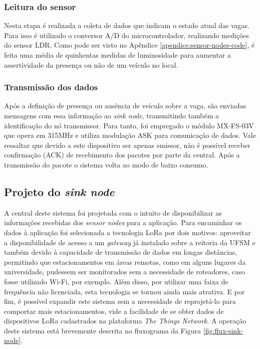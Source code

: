 \documentclass[oneside,openright,12pt]{ufsm_2015} %
\begin{document}
    \subsubsection{Leitura do sensor}
    Nesta etapa é realizada a coleta de dados que indicam o estado atual das vagas. Para isso é utilizado o conversor A/D do microcontrolador, realizando medições do sensor LDR. Como pode ser visto no Apêndice \ref{apendice:sensor-nodes-code}, é feita uma média de quinhentas medidas de luminosidade para aumentar a assertividade da presença ou não de um veículo no local.
    
    \subsubsection{Transmissão dos dados}
    Após a definição de presença ou ausência de veículo sobre a vaga, são enviadas mensagens com essa informação ao \textit{sink node}, transmitindo também a identificação do nó transmissor. Para tanto, foi empregado o módulo MX-FS-03V que opera em 315MHz e utiliza modulação ASK para comunicação de dados. Vale ressaltar que devido a este dispositivo ser apenas emissor, não é possível receber confirmação (ACK) de recebimento dos pacotes por parte da central. Após a transmissão do pacote o sistema volta ao modo de baixo consumo.
    
    \subsection{Projeto do \textit{sink node}}
    A central deste sistema foi projetada com o intuito de disponibilizar as informações recebidas dos \textit{sensor nodes} para a aplicação. Para encaminhar os dados à aplicação foi selecionada a tecnologia LoRa por dois motivos: aproveitar a disponibilidade de acesso a um \textit{gateway} já instalado sobre a reitoria da UFSM e também devido à capacidade de transmissão de dados em longas distâncias, permitindo que estacionamentos em áreas remotas, como em alguns lugares da universidade, pudessem ser monitorados sem a necessidade de roteadores, caso fosse utilizado Wi-Fi, por exemplo. Além disso, por utilizar uma faixa de frequência não licenciada, esta tecnologia se tornou ainda mais atrativa. E por fim, é possível expandir este sistema sem a necessidade de reprojetá-lo para comportar mais estacionamentos, vide a facilidade de se obter dados de dispositivos LoRa cadastrados na plataforma \textit{The Things Network}. A operação deste sistema está brevemente descrita no fluxograma da Figura \ref{fig:flux-sink-node}.
    
\end{document}
